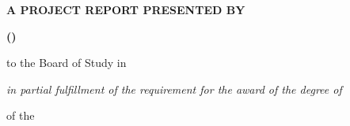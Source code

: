     \title{}
\date{}
\author{}

\begin{titlepage}
    \begin{center}
    
    \begin{spacing}{1}
    {\fontsize{14pt}{0pt}\selectfont
    \textbf{\expandafter\MakeUppercase{\projectTitle}}}
    \end{spacing}
    
    \vspace{2.5cm}
    
    \textbf{\uppercase{a project report presented by}}
    
    \vspace{1.0cm}
    
    \begin{spacing}{1}
    \textbf{\uppercase{\expandafter\MakeUppercase{\nameWithInitials}}}
    \linebreak
    \textbf{\uppercase{\expandafter\MakeUppercase{(\registrationNumber)}}}
    \end{spacing}

    \vspace{1.0cm}
    
    \begin{spacing}{1.5}
    {to the Board of Study in}
    \linebreak
    \textbf{\expandafter\MakeUppercase{\departmentName}}
    
    \vspace{2.5cm}

    {\textit{ in partial fulfillment of the requirement \linebreak for the award of the degree of}}
    \end{spacing}
    
    \vspace{2.5cm}
    
    {\textbf{\degreeName}}
    
    \vspace{2.5cm}
    
    {of the}
    
    \vspace*{\fill}
    
    \begin{spacing}{1.5}
    {\expandafter\MakeUppercase{{\textbf{\universityName \linebreak \universityCountry \linebreak \publicationYear}}}}
    \end{spacing}
    
    \end{center}
    \thispagestyle{empty}
\end{titlepage}


